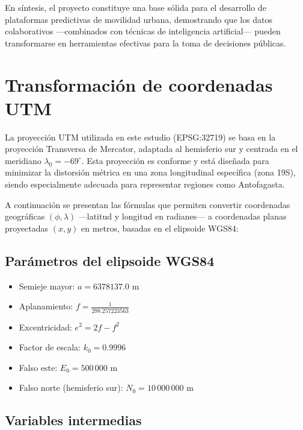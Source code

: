 \documentclass[12pt]{article}
\begin{document}
En síntesis, el proyecto constituye una base sólida para el desarrollo de plataformas predictivas de movilidad urbana, demostrando que los datos colaborativos —combinados con técnicas de inteligencia artificial— pueden transformarse en herramientas efectivas para la toma de decisiones públicas.

\newpage

\printbibliography

\newpage

\appendix

\setcounter{page}{1}

\section{Transformación de coordenadas UTM}
\label{ap:utm}

La proyección UTM utilizada en este estudio (EPSG:32719) se basa en la proyección Transversa de Mercator, adaptada al hemisferio sur y centrada en el meridiano $\lambda_0 = -69^\circ$. Esta proyección es conforme y está diseñada para minimizar la distorsión métrica en una zona longitudinal específica (zona 19S), siendo especialmente adecuada para representar regiones como Antofagasta.

A continuación se presentan las fórmulas que permiten convertir coordenadas geográficas $(\phi, \lambda)$ —latitud y longitud en radianes— a coordenadas planas proyectadas $(x, y)$ en metros, basadas en el elipsoide WGS84:

\subsection*{Parámetros del elipsoide WGS84}

\begin{itemize}
  \item Semieje mayor: $a = 6378137.0$ m
  \item Aplanamiento: $f = \frac{1}{298.257223563}$
  \item Excentricidad: $e^2 = 2f - f^2$
  \item Factor de escala: $k_0 = 0.9996$
  \item Falso este: $E_0 = 500\,000$ m
  \item Falso norte (hemisferio sur): $N_0 = 10\,000\,000$ m
\end{itemize}

\subsection*{Variables intermedias}
\end{document}
